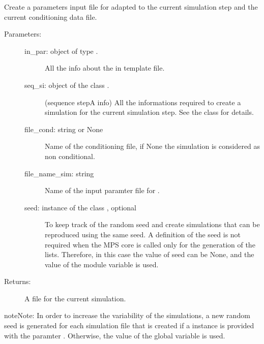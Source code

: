\documentclass[letterpaper,10pt,english]{sphinxmanual}
\begin{document}
\begin{fulllineitems}
\label{\detokenize{appendices:s2Dcd.s2Dcd.create_in_file4MPDS}}
Create a parameters input file for  adapted to the current
simulation step and the current conditioning data file.
\begin{description}
\item[{Parameters:}] \leavevmode\begin{description}
\item[{in\_par: object of type .}] \leavevmode
All the info about the in template file.

\item[{seq\_si: object of the class {\hyperref[\detokenize{appendices:s2Dcd.s2Dcd.SeqStep}]{}}.}] \leavevmode
(sequence stepA info) All the informations required to
create a simulation for the current simulation step. See
the class {\hyperref[\detokenize{appendices:s2Dcd.s2Dcd.SeqStep}]{}} for details.

\item[{file\_cond: string or None}] \leavevmode
Name of the conditioning file, if None the simulation is
considered as non conditional.

\item[{file\_name\_sim: string}] \leavevmode
Name of the input paramter file for .

\item[{seed: instance of the class , optional}] \leavevmode
To keep track of the random seed and create simulations
that can be reproduced using the same seed.  A definition
of the seed is not required when the MPS core is called
only for the generation of the lists. Therefore, in this
case the value of seed can be None, and the value of the
module variable  is used.

\end{description}

\item[{Returns:}] \leavevmode
A  file for the current simulation.

\end{description}

\begin{sphinxadmonition}{note}{Note:}
In order to increase the variability of the simulations, a new
random seed is generated for each simulation file that is
created if a  instance is provided with
the paramter . Otherwise, the value of the global
variable  is used.
\end{sphinxadmonition}

\end{fulllineitems}
\end{document}
